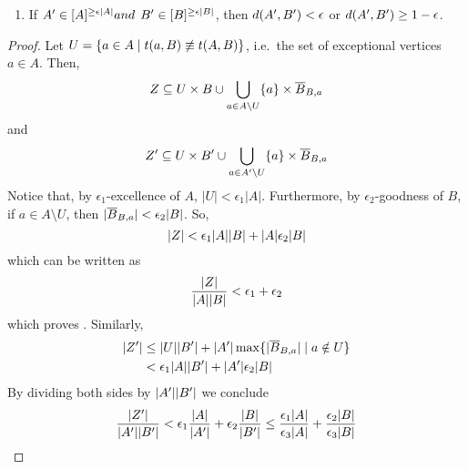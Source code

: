 \begin{lemma}[Lemma 5.17]
\begin{enumerate}[label=\alph*., ref=\alph*]
                \item \label{itm:excellence_implies_regularity.b} If $A' \in [ A ]^{\geq \epsilon | A |} and $
                    $B' \in [ B ]^{\geq \epsilon | B |}$, then $d ( A',B' ) < \epsilon$ or
                    $d ( A',B' ) \geq 1 - \epsilon$.
            \end{enumerate}
            \begin{proof}
                Let $U = \{ a \in A \mid t(a,B) \not\equiv t(A,B) \}$, i.e.~the set
                of exceptional vertices $a \in A$.
                Then,
                \[
                    Z \subseteq U \times B \cup \bigcup_{a \in A \setminus U} \{ a \} \times \overline{B}_{B,a}
                \]
                and
                \[
                    Z' \subseteq U \times B' \cup \bigcup_{a \in A' \setminus U} \{ a \} \times \overline{B}_{B,a}
                \]
                Notice that, by $\epsilon_1$-excellence of $A$, $|U| < \epsilon_1 |A|$.
                Furthermore, by $\epsilon_2$-goodness of $B$,
                if $a \in A \setminus U$, then $| \overline{B}_{B,a} | < \epsilon_2 | B |$.
                So,
                \[
                    | Z | < \epsilon_1 | A | | B | + | A | \epsilon_2 | B |
                \]
                which can be written as
                \[
                        \frac{| Z |}{| A | | B |} < \epsilon_1 + \epsilon_2
                \]
                which proves .
                Similarly,
                \begin{align*}
                    | Z' | & \leq | U | | B' | + | A' | \max \{ | \overline{B}_{B,a} | \mid a \notin U \} \\
                                     & < \epsilon_1 | A | | B' | + | A' | \epsilon_2 | B |
                \end{align*}
                By dividing both sides by $| A' | | B' |$ we conclude
                \[
                    \frac{| Z' |}{| A' | | B' |} < \epsilon_1 \frac{| A |}{| A' |} + \epsilon_2 \frac{| B |}{| B' |}
                    \leq \frac{\epsilon_1 | A |}{\epsilon_3 | A |} + \frac{\epsilon_2 | B |} {\epsilon_3 | B |}
\]
\end{proof}
\end{lemma}
